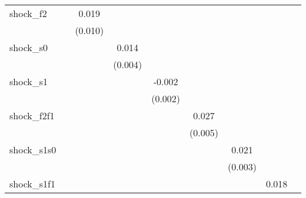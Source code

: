 {\begin{tabular}{l*{8}{c}}
\addlinespace
shock\_f2    &                     &       0.019\sym{*}  &                     &                     &                     &                     &                     &                     \\
            &                     &     (0.010)         &                     &                     &                     &                     &                     &                     \\
\addlinespace
shock\_s0    &                     &                     &       0.014\sym{***}&                     &                     &                     &                     &                     \\
            &                     &                     &     (0.004)         &                     &                     &                     &                     &                     \\
\addlinespace
shock\_s1    &                     &                     &                     &      -0.002         &                     &                     &                     &                     \\
            &                     &                     &                     &     (0.002)         &                     &                     &                     &                     \\
\addlinespace
shock\_f2f1  &                     &                     &                     &                     &       0.027\sym{***}&                     &                     &                     \\
            &                     &                     &                     &                     &     (0.005)         &                     &                     &                     \\
\addlinespace
shock\_s1s0  &                     &                     &                     &                     &                     &       0.021\sym{***}&                     &                     \\
            &                     &                     &                     &                     &                     &     (0.003)         &                     &                     \\
\addlinespace
shock\_s1f1  &                     &                     &                     &                     &                     &                     &       0.018\sym{**} &                     \\

\end{tabular}}
